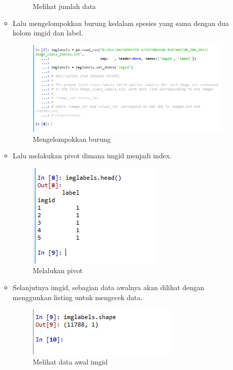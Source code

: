 \begin{enumerate}
\begin{itemize}
\begin{figure}[!hbtp]
			\caption{Melihat jumlah data}
			\label{contoh}
			\end{figure}
		\item Lalu mengelompokkan burung kedalam spesies yang sama dengan dua kolom imgid dan label.
			\begin{figure}[!hbtp]
			\centering
			\includegraphics[scale=0.5]{figures/AIP/ai13.PNG}
			\caption{Mengelompokkan burung}
			\label{contoh}
			\end{figure}
		\item Lalu melakukan pivot dimana imgid menjadi index.
			\begin{figure}[!hbtp]
			\centering
			\includegraphics[scale=0.5]{figures/AIP/ai14.PNG}
			\caption{Melalukan pivot}
			\label{contoh}
			\end{figure}
		\item Selanjutnya imgid, sebagian data awalnya akan dilihat dengan menggunkan listing untuk mengecek data.
			\begin{figure}[!hbtp]
			\centering
			\includegraphics[scale=0.5]{figures/AIP/ai15.PNG}
			\caption{Melihat data awal imgid}
			\label{contoh}
			\end{figure}

\end{itemize}
\end{enumerate}
